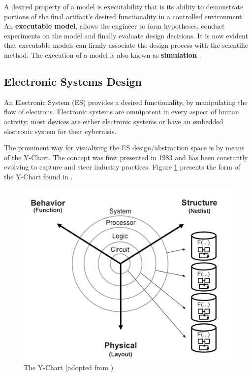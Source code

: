 \documentclass[12pt,twoside]{article}
\begin{document}
A desired property of a model is executability that is its ability to demonstrate portions of the final artifact's desired functionality in a controlled environment.
An \textbf{executable model}, allows the engineer to form hypotheses, conduct experiments on the model and finally evaluate design decisions.
It is now evident that executable models can firmly associate the design process with the scientific method.
The execution of a model is also known as \textbf{simulation} \cite{Editor2014}.


\subsection{Electronic Systems Design}
\label{sec-3-2}
An Electronic System (ES) provides a desired functionality, by manipulating the flow of electrons.
Electronic systems are omnipotent in every aspect of human activity; 
most devices are either electronic systems or have an embedded electronic system for their cybernisis.

The prominent way for visualizing the ES design/abstraction space is by means of the Y-Chart.
The concept was first presented in 1983 \cite{Gajski1983} and has been constantly evolving to capture and steer industry practices.
Figure \ref{fig:Y-Chart} presents the form of the Y-Chart found in \cite{Gajski2009}.

\begin{figure}[htb]
\centering
\includegraphics[scale=.45]{Figures/y-chart.png}
\caption{\label{fig:Y-Chart}The Y-Chart (adopted from \cite{Gajski2009})}
\end{figure}
\end{document}
